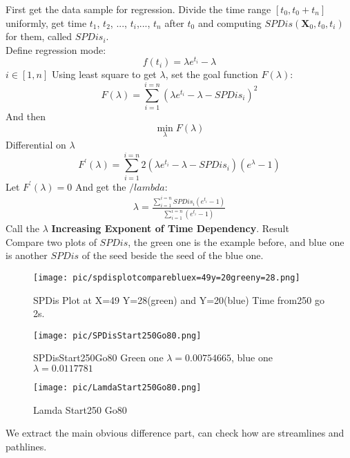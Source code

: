 \documentclass[
     11pt,         %
     a4paper,      %
     oneside,
     ]{article}
\newcommand{\vect}[1]{\boldsymbol{#1}}
\begin{document}
	First get the data sample for regression. Divide the time range $[t_{0},t_{0}+t_{n}]$ uniformly, get time  $t_{1}$, $t_{2}$, ..., $t_{i}$,..., $t_{n}$ after $t_{0}$ and computing $SPDis(\vect{X}_{0},t_{0},t_{i})$ for them, called $SPDis_{i}$.\\
	Define regression mode:
	$$f(t_{i})=\lambda e^{t_{i}}-\lambda$$ $i\in [1,n]$
	Using least square to get $\lambda$, set the goal function $F(\lambda)$:
	$$F(\lambda)=\sum_{i=1}^{i=n}(\lambda e^{t_{i}}-\lambda-SPDis_{i})^{2}$$
	And then $$\min_{\lambda} F(\lambda)$$
	Differential on $\lambda$
	$$F^{'}(\lambda)=\sum_{i=1}^{i=n}2(\lambda e^{t_{i}}-\lambda-SPDis_{i})(e^{\lambda}-1)$$
	Let $F^{'}(\lambda)=0$
	And get the $/lambda$:
	\begin{eqnarray}
	\lambda=\frac{\sum_{i=1}^{i=n}SPDis_{i}(e^{t_{i}}-1)}{\sum_{i=1}^{i=n}(e^{t_{i}}-1)}
	\end{eqnarray}
	Call the $\lambda$ \textbf{Increasing Exponent of Time Dependency}.
Result\\
	Compare two plots of $SPDis$, the green one is the example before, and blue one is another $SPDis$ of the seed beside the seed of the blue one.
			\begin{figure}[H]
				\centering
				\texttt{[image: pic/spdisplotcomparebluex=49y=20greeny=28.png]}
				\caption{{\tiny SPDis Plot at X=49 Y=28(green) and Y=20(blue) Time from250 go 2s. }}
				\label{fig:spdisplotcomparebluex=49y=20greeny=28}
			\end{figure}
			
			
	           \begin{figure}[H]
						\centering
						\begin{minipage}{0.65\textwidth}
							\centering
							\texttt{[image: pic/SPDisStart250Go80.png]}
							\caption{{\tiny SPDisStart250Go80 Green one $\lambda=0.00754665$, blue one $\lambda=0.0117781$}}
							\label{fig:SPDisStart250Go80}
						\end{minipage}
						\begin{minipage}{0.65\textwidth}
							\centering
							\texttt{[image: pic/LamdaStart250Go80.png]}
							\caption{{\tiny Lamda Start250 Go80}}
							\label{fig:LamdaStart250Go80}
						\end{minipage}
						
					\end{figure}
					
		We extract the main obvious difference part, can check how are streamlines and pathlines. 
				
\end{document}
